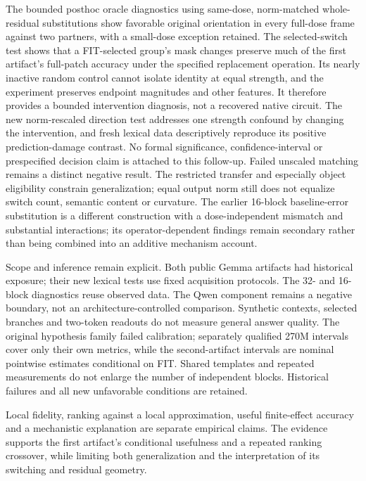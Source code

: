 The bounded posthoc oracle diagnostics using same-dose, norm-matched whole-residual substitutions show favorable original orientation in every full-dose frame against two partners, with a small-dose exception retained. The selected-switch test shows that a FIT-selected group's mask changes preserve much of the first artifact's full-patch accuracy under the specified replacement operation. Its nearly inactive random control cannot isolate identity at equal strength, and the experiment preserves endpoint magnitudes and other features. It therefore provides a bounded intervention diagnosis, not a recovered native circuit. The new norm-rescaled direction test addresses one strength confound by changing the intervention, and fresh lexical data descriptively reproduce its positive prediction-damage contrast. No formal significance, confidence-interval or prespecified decision claim is attached to this follow-up. Failed unscaled matching remains a distinct negative result. The restricted transfer and especially object eligibility constrain generalization; equal output norm still does not equalize switch count, semantic content or curvature. The earlier 16-block baseline-error substitution is a different construction with a dose-independent mismatch and substantial interactions; its operator-dependent findings remain secondary rather than being combined into an additive mechanism account.

Scope and inference remain explicit. Both public Gemma artifacts had historical exposure; their new lexical tests use fixed acquisition protocols. The 32- and 16-block diagnostics reuse observed data. The Qwen component remains a negative boundary, not an architecture-controlled comparison. Synthetic contexts, selected branches and two-token readouts do not measure general answer quality. The original hypothesis family failed calibration; separately qualified 270M intervals cover only their own metrics, while the second-artifact intervals are nominal pointwise estimates conditional on FIT. Shared templates and repeated measurements do not enlarge the number of independent blocks. Historical failures and all new unfavorable conditions are retained.

Local fidelity, ranking against a local approximation, useful finite-effect accuracy and a mechanistic explanation are separate empirical claims. The evidence supports the first artifact's conditional usefulness and a repeated ranking crossover, while limiting both generalization and the interpretation of its switching and residual geometry.
\clearpage
\appendix
